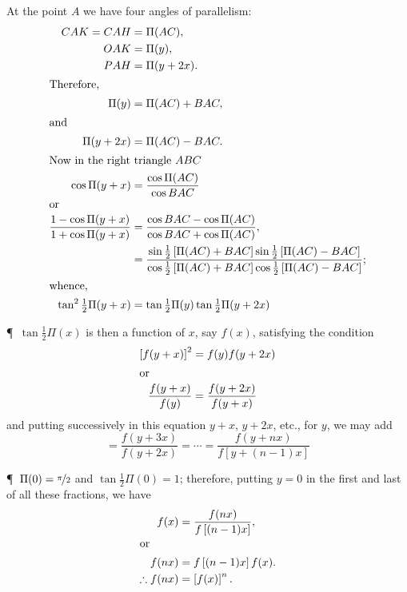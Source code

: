 \begin{description}
At the point $A$ we have four angles of parallelism:
\begin{align*}
 CAK = CAH &= \Pi (AC),       \\
       OAK &= \Pi (y) ,       \\
       PAH &= \Pi (y+2x) .    \\
\intertext{Therefore, }
   \Pi (y) &= \Pi (AC) + BAC ,\\
\intertext{and}
\Pi (y+2x) &= \Pi (AC) - BAC . \\
\intertext{Now in the right triangle $ABC$}
\cos \Pi (y + x) &= \frac{\cos \Pi (AC)}{\cos BAC} \\
\intertext{or}
  \frac{1-\cos \Pi (y+x)}{1+\cos \Pi (y+x)}
&= \frac{\cos BAC - \cos \Pi (AC)}{\cos BAC + \cos \Pi (AC)}, \\
&= \frac{ \sin \tfrac{1}{2} \left[ \Pi (AC) + BAC \right]
          \sin \tfrac{1}{2} \left[ \Pi (AC) - BAC \right] }
        { \cos \tfrac{1}{2} \left[ \Pi (AC) + BAC \right]
          \cos \tfrac{1}{2} \left[ \Pi (AC) - BAC \right] }; \\
\intertext{whence,}
\tan^2 \tfrac{1}{2} \Pi (y + x)
  &= \tan \tfrac{1}{2} \Pi (y) \tan \tfrac{1}{2} \Pi (y + 2x)
\end{align*}

\P~$\tan \frac{1}{2} \Pi(x)$ is then a function of $x$, say $f(x)$,
satisfying the condition
\begin{align*}
  \left[ f(y + x) \right]^2 & = f(y) f(y+2x) \\
\intertext{or}
  \frac{f(y+x)}{f(y)} & = \frac{f(y+2x)}{f(y+x)}
\end{align*}
and putting successively in this equation $y + x$, $y + 2x$, etc.,
for $y$, we may add
\begin{equation*}
= \frac{f(y+3x)}{f(y+2x)} = \cdots
= \frac{f(y+nx)}{f \left[ y+(n-1)x \right]}
\end{equation*}

\P~$\Pi (0) = \nicefrac{\pi}{2}$ and $\tan \tfrac{1}{2} \Pi (0) =
1$; therefore, putting $y = 0$ in the first and last of all these
fractions, we have
\begin{align*}
  f(x) & = \frac{f(nx)}{f\left[ (n-1) x\right]} , \\
\intertext{or}
  f(nx) & = f\left[(n-1)x \right] f(x). \\
\therefore f(nx) & = \left[ f(x)\right]^n .
\end{align*}


\end{description}
